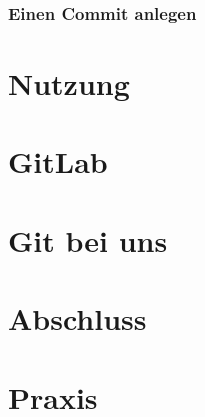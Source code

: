 \documentclass[aspectratio=169]{beamer}
\begin{document}
\begin{frame}
    \frametitle{Einen Commit anlegen}
    \begin{center}
        
    \end{center}
\end{frame}

\section{Nutzung}


\section{GitLab}

\section{Git bei uns}

\section{Abschluss}

\section{Praxis}
\end{document}
